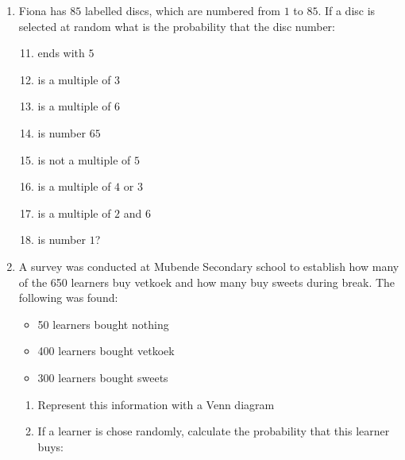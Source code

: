 \begin{exercises}{}
{\begin{enumerate}[itemsep=6pt, label=\textbf{\arabic*}. ]
\begin{center}
\begin{tabular}{|l|c|c|c|}
      \end{tabular}
    \end{center}
    If a pupil is selected at random what is the probability that the
    pupil will be:
    \begin{enumerate}[noitemsep, label=\textbf{(\alph*)} ]
    \item a female
    \item a $4$ year old male
    \item aged $3$ or $4$
    \item aged $3$ and $4$
    \item not $5$
    \item either $3$ or female?
    \end{enumerate}
  \item Fiona has $85$ labelled discs, which are numbered from $1$ to
    $85$. If a disc is selected at random what is the probability that
    the disc number:
    \begin{enumerate}[noitemsep, label=\textbf{(\alph*)} ]
    \setcounter{enumi}{10}
    \item ends with $5$
    \item is a multiple of $3$
    \item is a multiple of $6$
    \item is number $65$
    \item is not a multiple of $5$
    \item is a multiple of $4$ or $3$
    \item is a multiple of $2$ and $6$
    \item is number $1$?
    \end{enumerate}
\item A survey was conducted at Mubende Secondary school to establish how many of the 650 learners buy vetkoek and how many buy sweets during break. The following was found:
\begin{itemize}
 \item 50 learners bought nothing
\item 400 learners bought vetkoek
\item 300 learners bought sweets
\end{itemize}
\begin{enumerate}[noitemsep, label=\textbf{(\alph*)} ]
 \item Represent this information with a Venn diagram
\item If a learner is chose randomly, calculate the probability that this learner buys:
\begin{enumerate}[noitemsep, label=\textbf{(\roman*)} ]

\end{enumerate}
\end{enumerate}
\end{enumerate}}
\end{exercises}
